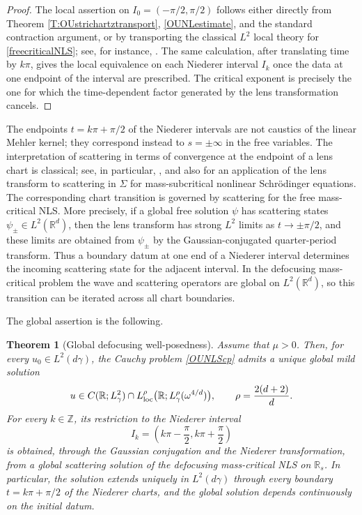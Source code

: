 \documentclass[11pt,a4paper]{amsart}
\newcommand{\Rm}{\mathbb R^d}
\numberwithin{equation}{section}
\newtheorem{theorem}{Theorem}[section]
\numberwithin{equation}{section}
\begin{document}
\begin{proof}
The local assertion on $I_0=(-\pi/2,\pi/2)$ follows either directly
from Theorem \ref{T:OUstrichartztransport}, \eqref{OUNLestimate},
and the standard contraction argument, or by transporting the
classical $L^2$ local theory for \eqref{freecriticalNLS}; see, for
instance, \cite{Caze}. The same calculation, after translating time
by $k\pi$, gives the local equivalence on each Niederer interval
$I_k$ once the data at one endpoint of the interval are prescribed.
The critical exponent is precisely the one for which the time-dependent
factor generated by the lens transformation cancels.

\end{proof}

 The endpoints $t=k\pi+\pi/2$ of the Niederer intervals are not
caustics of the linear Mehler kernel; they correspond instead to
$s=\pm\infty$ in the free variables. The interpretation of scattering
in terms of convergence at the endpoint of a lens chart is classical;
see, in particular, \cite{Carles,TaoLens}, and also \cite{BGTV} for
an application of the lens transform to scattering in $\Sigma$ for
mass-subcritical nonlinear Schr\"odinger equations. The corresponding
chart transition is governed by scattering for the free mass-critical
NLS. More precisely, if a global free solution $\psi$ has scattering
states $\psi_\pm\in L^2(\Rm)$, then the lens transform has strong
$L^2$ limits as $t\to\pm\pi/2$, and these limits are obtained from
$\psi_\pm$ by the Gaussian-conjugated quarter-period transform.
Thus a boundary datum at one end of a Niederer interval determines the
incoming scattering state for the adjacent interval. In the
defocusing mass-critical problem the wave and scattering operators
are global on $L^2(\Rm)$, so this transition can be iterated across all
chart boundaries.

The global assertion is the following.

\begin{theorem}[Global defocusing well-posedness]\label{T:OUdefocusing}
Assume that $\mu>0$.  Then, for every $u_0\in L^2(d\gamma)$, the Cauchy problem \eqref{OUNLScp} admits a unique global mild solution
\[
 u\in C(\mathbb R;L^2_\gamma)\cap L^\rho_{\rm loc}\bigl(\mathbb R;L^\rho_\gamma(\omega^{4/d})\bigr),
 \qquad \rho=\frac{2(d+2)}d.
\]
For every $k\in\mathbb Z$, its restriction to the Niederer interval
\[
 I_k=\left(k\pi-\frac\pi2,k\pi+\frac\pi2\right)
\]
is obtained, through the Gaussian conjugation and the Niederer transformation, from a global scattering solution of the defocusing mass-critical NLS on $\mathbb R_s$.  In particular, the solution extends uniquely in $L^2(d\gamma)$ through every boundary $t=k\pi+\pi/2$ of the Niederer charts, and the global solution depends continuously on the initial datum.
\end{theorem}
\end{document}
